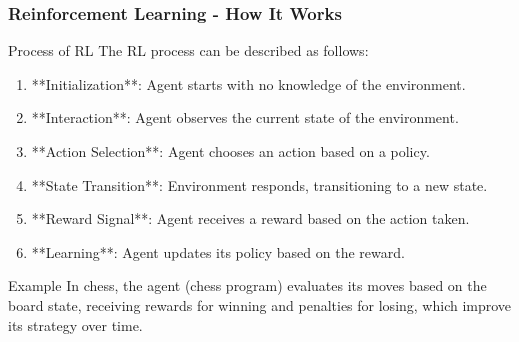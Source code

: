\documentclass[aspectratio=169]{beamer}
\begin{document}
\begin{frame}[fragile]
    \frametitle{Reinforcement Learning - How It Works}

    \begin{block}{Process of RL}
        The RL process can be described as follows:
    \end{block}

    \begin{enumerate}
        \item **Initialization**: Agent starts with no knowledge of the environment.
        \item **Interaction**: Agent observes the current state of the environment.
        \item **Action Selection**: Agent chooses an action based on a policy.
        \item **State Transition**: Environment responds, transitioning to a new state.
        \item **Reward Signal**: Agent receives a reward based on the action taken.
        \item **Learning**: Agent updates its policy based on the reward.
    \end{enumerate}
    
    \begin{block}{Example}
        In chess, the agent (chess program) evaluates its moves based on the board state, 
        receiving rewards for winning and penalties for losing, which improve its strategy over time.
    \end{block}
\end{frame}
\end{document}
